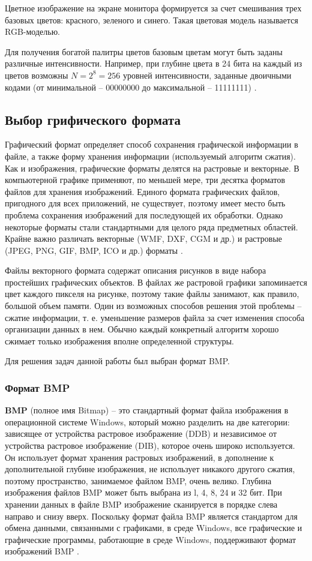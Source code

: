 Цветное изображение на экране монитора формируется за счет смешивания трех базовых цветов: красного, зеленого и синего. Такая цветовая модель называется RGB-моделью.

Для получения богатой палитры цветов базовым цветам могут быть заданы различные интенсивности. Например, при глубине цвета в 24 бита на каждый из цветов возможны $N = 2^8 = 256$ уровней интенсивности, заданные двоичными кодами (от минимальной -- 00000000 до максимальной -- 11111111) \cite{cg}.

\subsection{Выбор грифического формата}

Графический формат определяет способ сохранения графической информации в файле, а также форму хранения информации (используемый алгоритм сжатия). Как и изображения, графические форматы делятся на растровые и векторные. В компьютерной графике применяют, по меньшей мере, три десятка форматов файлов для хранения изображений. Единого формата графических файлов, пригодного для всех приложений, не существует, поэтому имеет место быть проблема сохранения изображений для последующей их обработки. Однако некоторые форматы стали стандартными для целого ряда предметных областей. Крайне важно различать векторные (WMF, DXF, CGM и др.) и растровые (JPEG, PNG, GIF, BMP, ICO и др.) форматы \cite{format}. 

Файлы векторного формата содержат описания рисунков в виде набора простейших графических объектов. В файлах же растровой графики запоминается цвет каждого пикселя на рисунке, поэтому такие файлы занимают, как правило, большой объем памяти. Один из возможных способов решения этой проблемы -- сжатие информации, т. е. уменьшение размеров файла за счет изменения способа организации данных в нем. Обычно каждый конкретный алгоритм хорошо сжимает только изображения вполне определенной структуры.

Для решения задач данной работы был выбран формат BMP.

\subsubsection{Формат BMP}

\textbf{BMP} (полное имя Bitmap) -- это стандартный формат файла изображения в операционной системе Windows, который можно разделить на две категории: зависящее от устройства растровое изображение (DDB) и независимое от устройства растровое изображение (DIB), которое очень широко используется. Он использует формат хранения растровых изображений, в дополнение к дополнительной глубине изображения, не использует никакого другого сжатия, поэтому пространство, занимаемое файлом BMP, очень велико. Глубина изображения файлов BMP может быть выбрана из l, 4, 8, 24 и 32 бит. При хранении данных в файле BMP изображение сканируется в порядке слева направо и снизу вверх. Поскольку формат файла BMP является стандартом для обмена данными, связанными с графиками, в среде Windows, все графические и графические программы, работающие в среде Windows, поддерживают формат изображений BMP \cite{bmp}.

